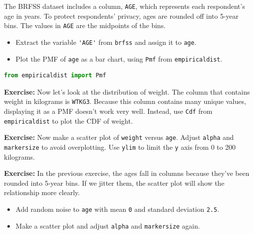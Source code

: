 The BRFSS dataset includes a column, \passthrough{\lstinline!AGE!},
which represents each respondent's age in years. To protect respondents'
privacy, ages are rounded off into 5-year bins. The values in
\passthrough{\lstinline!AGE!} are the midpoints of the bins.

\begin{itemize}
\item
  Extract the variable \passthrough{\lstinline!'AGE'!} from
  \passthrough{\lstinline!brfss!} and assign it to
  \passthrough{\lstinline!age!}.
\item
  Plot the PMF of \passthrough{\lstinline!age!} as a bar chart, using
  \passthrough{\lstinline!Pmf!} from
  \passthrough{\lstinline!empiricaldist!}.
\end{itemize}

\begin{lstlisting}[language=Python,style=source]
from empiricaldist import Pmf
\end{lstlisting}

\textbf{Exercise:} Now let's look at the distribution of weight. The
column that contains weight in kilograms is
\passthrough{\lstinline!WTKG3!}. Because this column contains many
unique values, displaying it as a PMF doesn't work very well. Instead,
use \passthrough{\lstinline!Cdf!} from
\passthrough{\lstinline!empiricaldist!} to plot the CDF of weight.

\textbf{Exercise:} Now make a scatter plot of
\passthrough{\lstinline!weight!} versus \passthrough{\lstinline!age!}.
Adjust \passthrough{\lstinline!alpha!} and
\passthrough{\lstinline!markersize!} to avoid overplotting. Use
\passthrough{\lstinline!ylim!} to limit the \passthrough{\lstinline!y!}
axis from 0 to 200 kilograms.

\textbf{Exercise:} In the previous exercise, the ages fall in columns
because they've been rounded into 5-year bins. If we jitter them, the
scatter plot will show the relationship more clearly.

\begin{itemize}

\item
  Add random noise to \passthrough{\lstinline!age!} with mean
  \passthrough{\lstinline!0!} and standard deviation
  \passthrough{\lstinline!2.5!}.
\item
  Make a scatter plot and adjust \passthrough{\lstinline!alpha!} and
  \passthrough{\lstinline!markersize!} again.
\end{itemize}

